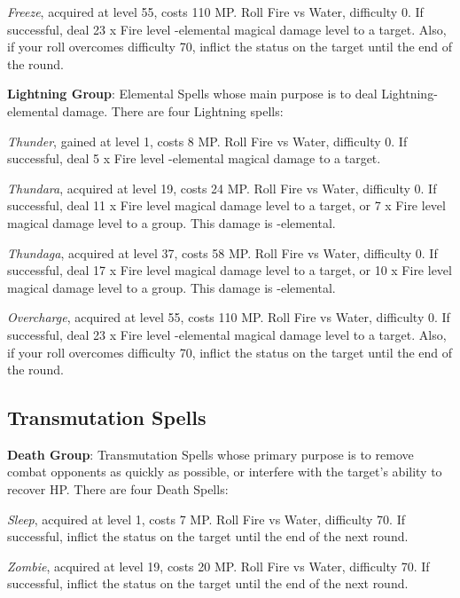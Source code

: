 \begin{multicols}{2}
    \textit{Freeze}, acquired at level 55, costs 110 MP. Roll Fire vs Water, difficulty 0. If successful, deal 23 x Fire level -elemental magical damage level to a target. Also, if your roll overcomes difficulty 70, inflict the  status on the target until the end of the round.
    
    \textbf{Lightning Group}: Elemental Spells whose main purpose is to deal Lightning-elemental damage. There are four Lightning spells:
    
    \textit{Thunder}, gained at level 1, costs 8 MP. Roll Fire vs Water, difficulty 0. If successful, deal 5 x Fire level -elemental magical damage to a target.
    
    \textit{Thundara}, acquired at level 19, costs 24 MP. Roll Fire vs Water, difficulty 0. If successful, deal 11 x Fire level magical damage level to a target, or 7 x Fire level magical damage level to a group. This damage is -elemental.
    
    \textit{Thundaga}, acquired at level 37, costs 58 MP. Roll Fire vs Water, difficulty 0. If successful, deal 17 x Fire level magical damage level to a target, or 10 x Fire level magical damage level to a group. This damage is -elemental.
    
    \textit{Overcharge}, acquired at level 55, costs 110 MP. Roll Fire vs Water, difficulty 0. If successful, deal 23 x Fire level -elemental magical damage level to a target. Also, if your roll overcomes difficulty 70, inflict the  status on the target until the end of the round.
    
    \subsection{Transmutation Spells}

    \textbf{Death Group}: Transmutation Spells whose primary purpose is to remove combat opponents as quickly as possible, or interfere with the target's ability to recover HP. There are four Death Spells:
    
    \textit{Sleep}, acquired at level 1, costs 7 MP. Roll Fire vs Water, difficulty 70. If successful, inflict the  status on the target until the end of the next round.
    
    \textit{Zombie}, acquired at level 19, costs 20 MP. Roll Fire vs Water, difficulty 70. If successful, inflict the  status on the target until the end of the next round.
    

\end{multicols}
